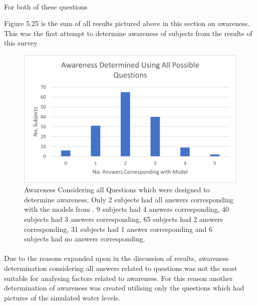 \paragraph{}

For both of these questions 

Figure 5.25 is the sum of all results pictured above in this section on awareness. This was the first attempt to determine awareness of subjects from the results of this survey

\begin{figure}[h!]
    \centering
    \includegraphics{fig_results/aware_all.png}
    \caption{Awareness Considering all Questions which were designed to determine awareness. Only 2 subjects had all answers corresponding with the models from \cite{kartverket_se_2020}. 9 subjects had 4 answers corresponding, 40 subjects had 3 answers corresponding, 65 subjects had 2 answers corresponding, 31 subjects had 1 answer corresponding and 6 subjects had no answers corresponding. }
    \label{fig:aware-all}
\end{figure}
\paragraph{}

Due to the reasons expanded upon in the discussion of results, awareness determination considering all answers related to questions was not the most suitable for analysing factors related to awareness. For this reason another determination of awareness was created utilising only the questions which had pictures of the simulated water levels. 
\paragraph{}

